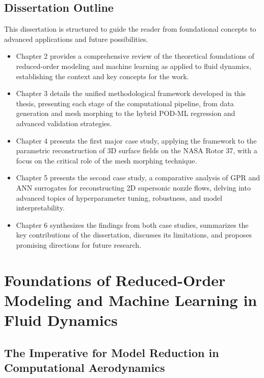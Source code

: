 \documentclass[dscexam, EN]{ufabcFHZh}
\begin{document}
\section{Dissertation Outline}

This dissertation is structured to guide the reader from foundational concepts to advanced applications and future possibilities.

\begin{itemize}
    \item Chapter 2 provides a comprehensive review of the theoretical foundations of reduced-order modeling and machine learning as applied to fluid dynamics, establishing the context and key concepts for the work.
    
    \item Chapter 3 details the unified methodological framework developed in this thesis, presenting each stage of the computational pipeline, from data generation and mesh morphing to the hybrid POD-ML regression and advanced validation strategies.
    
    \item Chapter 4 presents the first major case study, applying the framework to the parametric reconstruction of 3D surface fields on the NASA Rotor 37, with a focus on the critical role of the mesh morphing technique.
    
    \item Chapter 5 presents the second case study, a comparative analysis of GPR and ANN surrogates for reconstructing 2D supersonic nozzle flows, delving into advanced topics of hyperparameter tuning, robustness, and model interpretability.
    
    \item Chapter 6 synthesizes the findings from both case studies, summarizes the key contributions of the dissertation, discusses its limitations, and proposes promising directions for future research.
\end{itemize}
    

\chapter{Foundations of Reduced-Order Modeling and Machine Learning in Fluid Dynamics}
\label{chap:lit_review}

\section{ The Imperative for Model Reduction in Computational Aerodynamics}
\end{document}
